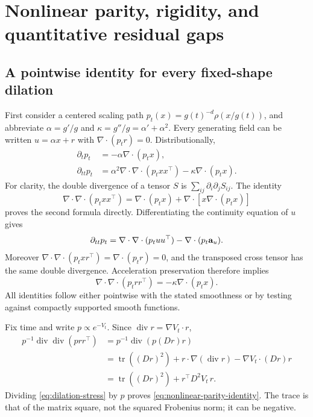 \section{Nonlinear parity, rigidity, and quantitative residual gaps}
\label{app:nonlinear-parity}

\subsection{A pointwise identity for every fixed-shape dilation}

First consider a centered scaling path $p_t(x)=g(t)^{-d}\rho(x/g(t))$,
and abbreviate $\alpha=g'/g$ and $\kappa=g''/g=\alpha'+\alpha^2$.
Every generating field can be written $u=\alpha x+r$ with
$\nabla\cdot(p_tr)=0$.  Distributionally,
\begin{align}
 \partial_t p_t&=-\alpha\nabla\cdot(p_tx),\nonumber\\
 \partial_{tt}p_t
 &=\alpha^2\nabla\cdot\nabla\cdot(p_txx^\top)
       -\kappa\nabla\cdot(p_tx).
 \label{eq:dilation-second-density}
\end{align}
For clarity, the double divergence of a tensor $S$ is
$\sum_{ij}\partial_i\partial_jS_{ij}$.  The identity
\[
 \nabla\cdot\nabla\cdot(p_txx^\top)
 =\nabla\cdot(p_tx)+\nabla\cdot[x\nabla\cdot(p_tx)]
\]
proves the second formula directly.  Differentiating the continuity
equation of $u$ gives
\[
 \partial_{tt}p_t
 =\nabla\cdot\nabla\cdot(p_tuu^\top)
      -\nabla\cdot(p_t\mathbf a_u).
\]
Moreover
$\nabla\cdot\nabla\cdot(p_txr^\top)
=\nabla\cdot(p_tr)=0$, and the transposed cross tensor has the same
double divergence.  Acceleration preservation therefore implies
\begin{equation}
 \nabla\cdot\nabla\cdot(p_trr^\top)
 =-\kappa\nabla\cdot(p_tx).
 \label{eq:dilation-stress}
\end{equation}
All identities follow either pointwise with the stated smoothness or
by testing against compactly supported smooth functions.

Fix time and write $p\propto e^{-V_t}$.  Since
$\operatorname{div}r=\nabla V_t\cdot r$,
\begin{align*}
 p^{-1}\operatorname{div}\operatorname{div}(prr^\top)
 &=p^{-1}\operatorname{div}(p(Dr)r)\\
 &=\operatorname{tr}((Dr)^2)
   +r\cdot\nabla(\operatorname{div}r)
   -\nabla V_t\cdot(Dr)r\\
 &=\operatorname{tr}((Dr)^2)+r^\top D^2V_t\,r.
\end{align*}
Dividing \eqref{eq:dilation-stress} by $p$ proves
\eqref{eq:nonlinear-parity-identity}.  The trace is that of the matrix
square, not the squared Frobenius norm; it can be negative.

